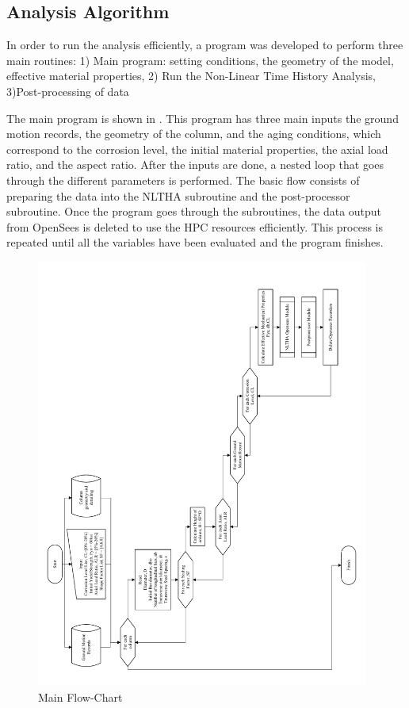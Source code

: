 \subsection{Analysis Algorithm}

In order to run the analysis efficiently, a program was developed to perform three main routines:
1) Main program: setting conditions, the geometry of the model, effective material properties, 2) Run the Non-Linear Time History Analysis, 3)Post-processing of data

The main program is shown in . This program has three main inputs the ground motion records, the geometry of the column, and the aging conditions, which correspond to the corrosion level, the initial material properties, the axial load ratio, and the aspect ratio. After the inputs are done, a nested loop that goes through the different parameters is performed. The basic flow consists of preparing the data into the NLTHA subroutine and the post-processor subroutine. Once the program goes through the subroutines, the data output from OpenSees is deleted to use the HPC resources efficiently. This process is repeated until all the variables have been evaluated and the program finishes.

\begin{figure}[htp]
	\centering
	\includegraphics[width=0.975\textwidth]{VAC Thesis 2.0/Chapter-5/figs/Main_FlowChart_01.pdf}
	\caption{Main Flow-Chart}
	\label{fig:main_flowchart}
\end{figure}

